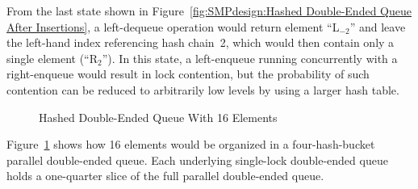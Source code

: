 From the last state shown in
Figure~\ref{fig:SMPdesign:Hashed Double-Ended Queue After Insertions},
a left-dequeue operation would return element ``L$_{-2}$'' and leave
the left-hand index referencing hash chain~2, which would then
contain only a single element (``R$_2$'').
In this state, a left-enqueue running concurrently with a right-enqueue
would result in lock contention, but the probability of such contention
can be reduced to arbitrarily low levels by using a larger hash table.

\begin{figure}[tb]
\centering
{}
\caption{Hashed Double-Ended Queue With 16 Elements}
\label{fig:SMPdesign:Hashed Double-Ended Queue With 16 Elements}
\end{figure}

Figure~\ref{fig:SMPdesign:Hashed Double-Ended Queue With 16 Elements}
shows how 16 elements would be organized in a four-hash-bucket
parallel double-ended queue.
Each underlying single-lock double-ended queue holds a one-quarter
slice of the full parallel double-ended queue.

